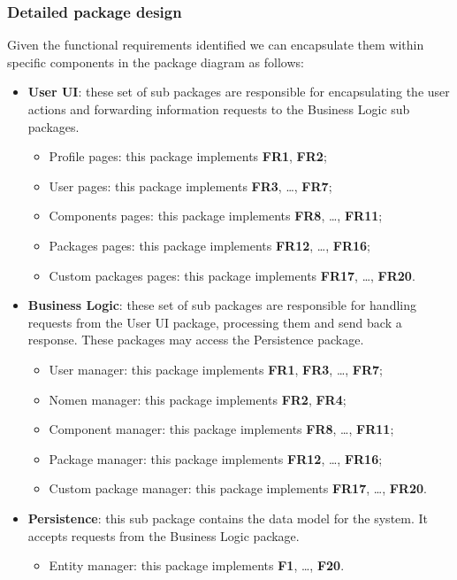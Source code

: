 \documentclass[a4paper,12pt]{book}
\begin{document}
\subsubsection{Detailed package design}
Given the functional requirements identified we can encapsulate them within specific components in the package diagram as follows:
\begin{itemize}
  \item \textbf{User UI}: these set of sub packages are responsible for encapsulating the user actions and forwarding information requests to the Business Logic sub packages.
  \begin{itemize}
    \item Profile pages: this package implements \textbf{FR1}, \textbf{FR2};
    \item User pages: this package implements \textbf{FR3}, \dots, \textbf{FR7};
    \item Components pages: this package implements \textbf{FR8}, \dots, \textbf{FR11};
    \item Packages pages: this package implements \textbf{FR12}, \dots, \textbf{FR16};
    \item Custom packages pages: this package implements \textbf{FR17}, \dots, \textbf{FR20}.
  \end{itemize}
  \item \textbf{Business Logic}: these set of sub packages are responsible for handling requests from the User UI package, processing them and send back a response. These packages may access the Persistence package.
  \begin{itemize}
    \item User manager: this package implements \textbf{FR1}, \textbf{FR3}, \dots, \textbf{FR7};
    \item Nomen manager: this package implements \textbf{FR2}, \textbf{FR4};
    \item Component manager: this package implements \textbf{FR8}, \dots, \textbf{FR11};
    \item Package manager: this package implements \textbf{FR12}, \dots, \textbf{FR16};
    \item Custom package manager: this package implements \textbf{FR17}, \dots, \textbf{FR20}.
  \end{itemize}
  \item \textbf{Persistence}: this sub package contains the data model for the system. It accepts requests from the Business Logic package.
  \begin{itemize}
    \item Entity manager: this package implements \textbf{F1}, \dots, \textbf{F20}.
  \end{itemize}
\end{itemize}
\end{document}
